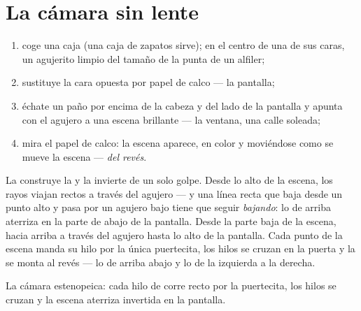 \section{La cámara sin lente}

\begin{method}\label{met:g6:light-propagation:pinhole}
\begin{enumerate}
  \item coge una caja (una caja de zapatos sirve); en el centro de
        una de sus caras,  un agujerito limpio del tamaño de la
        punta de un alfiler;
  \item sustituye la cara opuesta por papel de calco --- la
        pantalla;
  \item échate un paño por encima de la cabeza y del lado de la
        pantalla y apunta con el agujero a una escena brillante ---
        la ventana, una calle soleada;
  \item mira el papel de calco: la escena aparece, en color y
        moviéndose como se mueve la escena --- \emph{del revés}.
\end{enumerate}
\end{method}

\begin{proposition}\label{prop:g6:light-propagation:inverted}
La  construye la  y la invierte de un
solo golpe. Desde lo alto de la escena, los rayos viajan rectos a
través del agujero --- y una línea recta que baja desde un punto alto
y pasa por un agujero bajo tiene que seguir \emph{bajando}: lo de
arriba aterriza en la parte de abajo de la pantalla. Desde la parte
baja de la escena, hacia arriba a través del agujero hasta lo alto de
la pantalla. Cada punto de la escena manda su hilo por la única
puertecita, los hilos se cruzan en la puerta y la  se monta al
revés --- lo de arriba abajo y lo de la izquierda a la derecha.
\end{proposition}

\begin{omfigure}

{\small La cámara estenopeica: cada hilo de  corre recto por la
puertecita, los hilos se cruzan y la escena aterriza invertida en la
pantalla.}
\end{omfigure}


